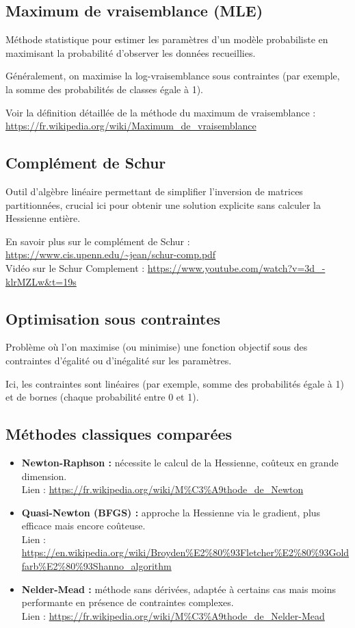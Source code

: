 \documentclass[12pt,a4paper]{article}
\begin{document}
	\subsection{Maximum de vraisemblance (MLE)}
	Méthode statistique pour estimer les paramètres d’un modèle probabiliste en maximisant la probabilité d’observer les données recueillies.
	
	Généralement, on maximise la log-vraisemblance sous contraintes (par exemple, la somme des probabilités de classes égale à 1).
	
	Voir la définition détaillée de la méthode du maximum de vraisemblance : \url{https://fr.wikipedia.org/wiki/Maximum_de_vraisemblance}
	
	\subsection{Complément de Schur}
	Outil d’algèbre linéaire permettant de simplifier l’inversion de matrices partitionnées, crucial ici pour obtenir une solution explicite sans calculer la Hessienne entière.
	
	En savoir plus sur le complément de Schur : \url{https://www.cis.upenn.edu/~jean/schur-comp.pdf} \\
	Vidéo sur le Schur Complement : \url{https://www.youtube.com/watch?v=3d_-klrMZLw&t=19s}
	
	\subsection{Optimisation sous contraintes}
	Problème où l’on maximise (ou minimise) une fonction objectif sous des contraintes d’égalité ou d’inégalité sur les paramètres.
	
	Ici, les contraintes sont linéaires (par exemple, somme des probabilités égale à 1) et de bornes (chaque probabilité entre 0 et 1).
	
	\subsection{Méthodes classiques comparées}
	\begin{itemize}
		\item \textbf{Newton-Raphson :} nécessite le calcul de la Hessienne, coûteux en grande dimension. \\
		Lien : \url{https://fr.wikipedia.org/wiki/M%C3%A9thode_de_Newton}
		\item \textbf{Quasi-Newton (BFGS) :} approche la Hessienne via le gradient, plus efficace mais encore coûteuse. \\
		Lien : \url{https://en.wikipedia.org/wiki/Broyden%E2%80%93Fletcher%E2%80%93Goldfarb%E2%80%93Shanno_algorithm}
		\item \textbf{Nelder-Mead :} méthode sans dérivées, adaptée à certains cas mais moins performante en présence de contraintes complexes. \\
		Lien : \url{https://fr.wikipedia.org/wiki/M%C3%A9thode_de_Nelder-Mead}
	\end{itemize}
	
\end{document}
